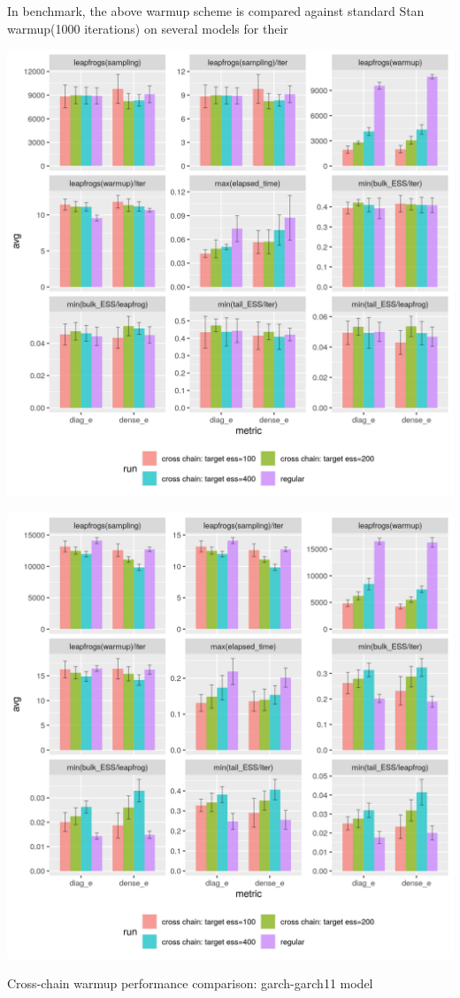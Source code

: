 \documentclass[landscape,a0paper,fontscale=0.5]{baposter} %
\newenvironment{ColFigure}
  {\par\medskip\noindent\minipage{\linewidth}}
  {\endminipage\par\medskip}
\begin{document}
\begin{poster}
{\begin{multicols}{2}
In benchmark, the above warmup scheme is compared against standard Stan warmup(1000
iterations) on several models for their
\begin{ColFigure}
\centering
\includegraphics[width=0.8\linewidth]{./figure/cross_chain_ess_effect_eight_schools.png}
\end{ColFigure}

\begin{ColFigure}
\centering
\includegraphics[width=0.8\linewidth]{./figure/cross_chain_ess_effect_sblrc-blr.png}
\caption{Cross-chain warmup performance comparison: garch-garch11 model}
\end{ColFigure}


\end{multicols}}
\end{poster}
\end{document}
